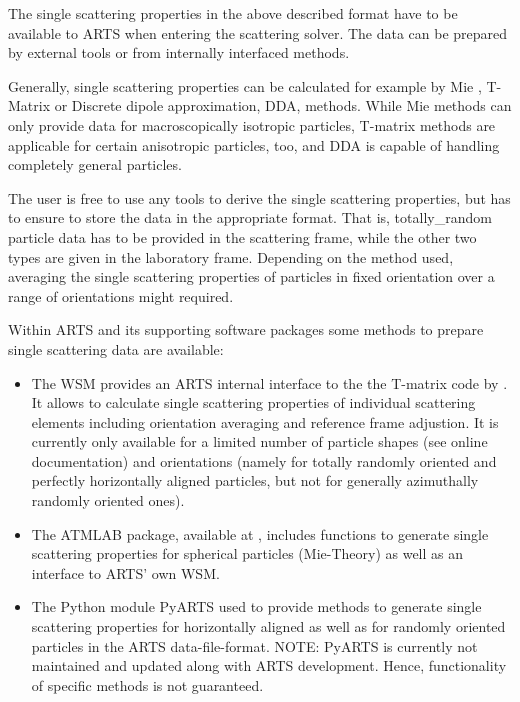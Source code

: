 The single scattering properties in the above described format have to be
available to ARTS when entering the scattering solver. The data can be
prepared by external tools or from internally interfaced methods.

Generally, single scattering properties can be calculated for example by Mie
\citep[e.g.][]{wiscombe80:_improved_ao, maetzler02:_matlab}, T-Matrix
\citep{Mishchenko:98} or Discrete dipole approximation, DDA,
\citep[e.g][]{yurkin11:_adda_jqsrt} methods. While Mie methods can only provide
data for macroscopically isotropic particles, T-matrix methods are applicable
for certain anisotropic particles, too, and DDA is capable of handling
completely general particles.

The user is free to use any tools to derive the single scattering
properties, but has to ensure to store the data in the appropriate format. That
is, totally\_random particle data has to be provided in the
scattering frame, while the other two types are given in the laboratory frame.
Depending on the method used, averaging the single scattering properties of
particles in fixed orientation over a range of orientations might required.

Within ARTS and its supporting software packages some methods to prepare single
scattering data are available:
\begin{itemize}
\item
The WSM  provides an ARTS internal interface
to the the T-matrix code by \citet{Mishchenko:02}. It allows to calculate single
scattering properties of individual scattering elements including orientation
averaging and reference frame adjustion. It is currently only available for a
limited number of particle shapes (see online documentation) and orientations
(namely for totally randomly oriented and perfectly horizontally aligned
particles, but not for generally azimuthally randomly oriented ones).
\item
The ATMLAB package, available at , includes functions to
generate single scattering properties for spherical particles (Mie-Theory) as
well as an interface to ARTS' own  WSM.
\item
The Python module PyARTS used to provide methods to generate single scattering
properties for horizontally aligned as well as for randomly oriented particles
in the ARTS data-file-format. NOTE: PyARTS is currently not maintained and
updated along with ARTS development. Hence, functionality of specific methods is
not guaranteed.
\end{itemize}

